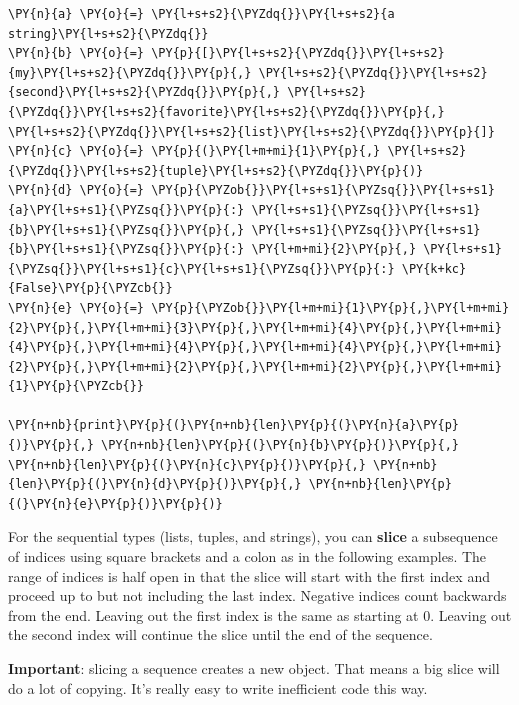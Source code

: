 \begin{Verbatim}[commandchars=\\\{\}]
\PY{n}{a} \PY{o}{=} \PY{l+s+s2}{\PYZdq{}}\PY{l+s+s2}{a string}\PY{l+s+s2}{\PYZdq{}}
\PY{n}{b} \PY{o}{=} \PY{p}{[}\PY{l+s+s2}{\PYZdq{}}\PY{l+s+s2}{my}\PY{l+s+s2}{\PYZdq{}}\PY{p}{,} \PY{l+s+s2}{\PYZdq{}}\PY{l+s+s2}{second}\PY{l+s+s2}{\PYZdq{}}\PY{p}{,} \PY{l+s+s2}{\PYZdq{}}\PY{l+s+s2}{favorite}\PY{l+s+s2}{\PYZdq{}}\PY{p}{,} \PY{l+s+s2}{\PYZdq{}}\PY{l+s+s2}{list}\PY{l+s+s2}{\PYZdq{}}\PY{p}{]}
\PY{n}{c} \PY{o}{=} \PY{p}{(}\PY{l+m+mi}{1}\PY{p}{,} \PY{l+s+s2}{\PYZdq{}}\PY{l+s+s2}{tuple}\PY{l+s+s2}{\PYZdq{}}\PY{p}{)}
\PY{n}{d} \PY{o}{=} \PY{p}{\PYZob{}}\PY{l+s+s1}{\PYZsq{}}\PY{l+s+s1}{a}\PY{l+s+s1}{\PYZsq{}}\PY{p}{:} \PY{l+s+s1}{\PYZsq{}}\PY{l+s+s1}{b}\PY{l+s+s1}{\PYZsq{}}\PY{p}{,} \PY{l+s+s1}{\PYZsq{}}\PY{l+s+s1}{b}\PY{l+s+s1}{\PYZsq{}}\PY{p}{:} \PY{l+m+mi}{2}\PY{p}{,} \PY{l+s+s1}{\PYZsq{}}\PY{l+s+s1}{c}\PY{l+s+s1}{\PYZsq{}}\PY{p}{:} \PY{k+kc}{False}\PY{p}{\PYZcb{}}
\PY{n}{e} \PY{o}{=} \PY{p}{\PYZob{}}\PY{l+m+mi}{1}\PY{p}{,}\PY{l+m+mi}{2}\PY{p}{,}\PY{l+m+mi}{3}\PY{p}{,}\PY{l+m+mi}{4}\PY{p}{,}\PY{l+m+mi}{4}\PY{p}{,}\PY{l+m+mi}{4}\PY{p}{,}\PY{l+m+mi}{4}\PY{p}{,}\PY{l+m+mi}{2}\PY{p}{,}\PY{l+m+mi}{2}\PY{p}{,}\PY{l+m+mi}{2}\PY{p}{,}\PY{l+m+mi}{1}\PY{p}{\PYZcb{}}

\PY{n+nb}{print}\PY{p}{(}\PY{n+nb}{len}\PY{p}{(}\PY{n}{a}\PY{p}{)}\PY{p}{,} \PY{n+nb}{len}\PY{p}{(}\PY{n}{b}\PY{p}{)}\PY{p}{,} \PY{n+nb}{len}\PY{p}{(}\PY{n}{c}\PY{p}{)}\PY{p}{,} \PY{n+nb}{len}\PY{p}{(}\PY{n}{d}\PY{p}{)}\PY{p}{,} \PY{n+nb}{len}\PY{p}{(}\PY{n}{e}\PY{p}{)}\PY{p}{)}
\end{Verbatim}



For the sequential types (lists, tuples, and strings), you can \textbf{slice} a subsequence of indices using square brackets and a colon as in the following examples.  The range of indices is half open in that the slice will start with the first index and proceed up to but not including the last index.  Negative indices count backwards from the end.  Leaving out the first index is the same as starting at 0.  Leaving out the second index will continue the slice until the end of the sequence.


\textbf{Important}: slicing a sequence creates a new object.  That means a big slice will do a lot of copying.  It's really easy to write inefficient code this way.

